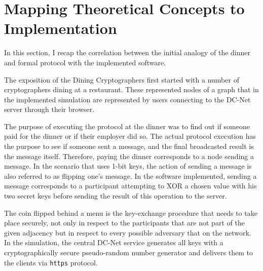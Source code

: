 \section{Mapping Theoretical Concepts to Implementation}
In this section, I recap the correlation between the initial analogy of the dinner and formal protocol with the implemented software. \newline

The exposition of the Dining Cryptographers first started with a number of cryptographers dining at a restaurant. These represented nodes of a graph that in the implemented simulation are represented by users connecting to the DC-Net server through their browser. \newline

The purpose of executing the protocol at the dinner was to find out if someone paid for the dinner or if their employer did so. The actual protocol execution has the purpose to see if someone sent a message, and the final broadcasted result is the message itself. Therefore, paying the dinner corresponds to a node sending a message. In the scenario that uses 1-bit keys, the action of sending a message is also referred to as flipping one's message. In the software implemented, sending a message corresponds to a participant attempting to XOR a chosen value with his two secret keys before sending the result of this operation to the server. \newline

The coin flipped behind a menu is the key-exchange procedure that needs to take place securely, not only in respect to the participants that are not part of the given adjacency but in respect to every possible adversary that on the network. In the simulation, the central DC-Net service generates all keys with a cryptographically secure pseudo-random number generator and delivers them to the clients via \lstinline{https} protocol. \newline

